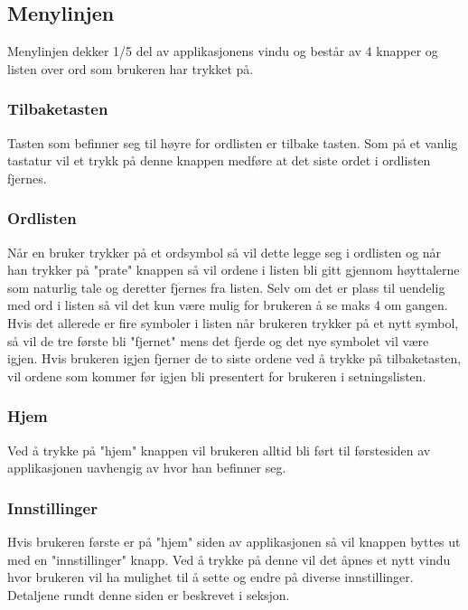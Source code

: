 \subsection{Menylinjen} 
 
Menylinjen dekker 1/5 del av applikasjonens vindu og består av 4 knapper og listen over ord som brukeren har trykket på. 
 
\subsubsection{Tilbaketasten} 
 
Tasten som befinner seg til høyre for ordlisten er tilbake tasten. Som på et vanlig tastatur vil et trykk på denne knappen medføre at det siste ordet i ordlisten fjernes. 
 
\subsubsection{Ordlisten} 
 
Når en bruker trykker på et ordsymbol så vil dette legge seg i ordlisten og når han trykker på "prate" knappen så vil ordene i listen bli gitt gjennom høyttalerne som naturlig tale og deretter fjernes fra listen. Selv om det er plass til uendelig med ord i listen så vil det kun være mulig for brukeren å se maks 4 om gangen. Hvis det allerede er fire symboler i listen når brukeren trykker på et nytt symbol, så vil de tre første bli "fjernet" mens det fjerde og det nye symbolet vil være igjen. Hvis brukeren igjen fjerner de to siste ordene ved å trykke på tilbaketasten,  vil ordene som kommer før igjen bli presentert for brukeren i setningslisten.  
 
 
\subsubsection{Hjem} 
Ved å trykke på "hjem" knappen vil brukeren alltid bli ført til førstesiden av applikasjonen uavhengig av hvor han befinner seg.  
 
\subsubsection{Innstillinger} 
Hvis brukeren første er på "hjem" siden av applikasjonen så vil knappen byttes ut med en "innstillinger" knapp. Ved å trykke på denne vil det åpnes et nytt vindu hvor brukeren vil ha mulighet til å sette og endre på diverse innstillinger. Detaljene rundt denne siden er beskrevet i seksjon. 
 
